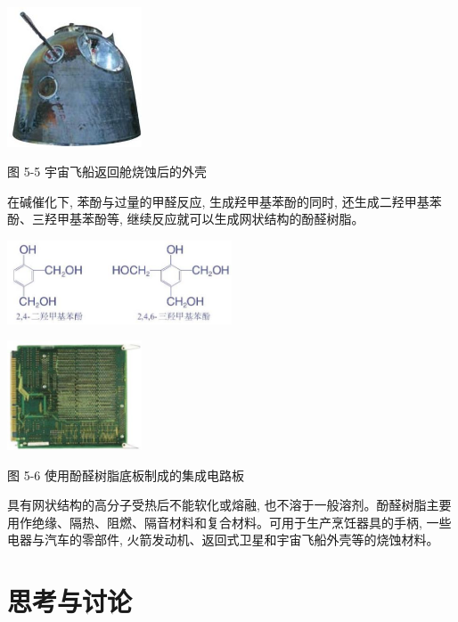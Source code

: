 \documentclass[10pt]{article}
\begin{document}
\begin{center}
\includegraphics[max width=0.3\textwidth]{images/0190efc5-b58a-7c43-bfb0-e0a030df9cfd_146_686219.jpg}
\end{center}

图 5-5 宇宙飞船返回舱烧蚀后的外壳

在碱催化下, 苯酚与过量的甲醛反应, 生成羟甲基苯酚的同时, 还生成二羟甲基苯酚、三羟甲基苯酚等, 继续反应就可以生成网状结构的酚醛树脂。

\begin{center}
\includegraphics[max width=0.5\textwidth]{images/0190efc5-b58a-7c43-bfb0-e0a030df9cfd_146_957582.jpg}
\end{center}

\begin{center}
\includegraphics[max width=0.3\textwidth]{images/0190efc5-b58a-7c43-bfb0-e0a030df9cfd_146_698444.jpg}
\end{center}

图 5-6 使用酚醛树脂底板制成的集成电路板

具有网状结构的高分子受热后不能软化或熔融, 也不溶于一般溶剂。酚醛树脂主要用作绝缘、隔热、阻燃、隔音材料和复合材料。可用于生产烹饪器具的手柄, 一些电器与汽车的零部件, 火箭发动机、返回式卫星和宇宙飞船外壳等的烧蚀材料。

\section*{思考与讨论}
\end{document}
